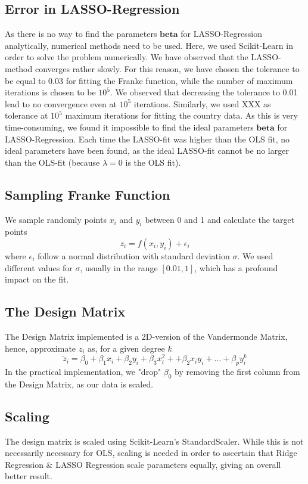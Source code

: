 \documentclass[11pt,a4paper,titlepage]{article}
\begin{document}
\subsection{Error in LASSO-Regression}
As there is no way to find the parameters $\bm{beta}$ for LASSO-Regression analytically, numerical methods need to be used. Here, we used Scikit-Learn in order to solve the problem numerically. We have observed that the LASSO-method converges rather slowly. For this reason, we have chosen the tolerance to be equal to 0.03 for fitting the Franke function, while the number of maximum iterations is chosen to be $10^5$. We observed that decreasing the tolerance to 0.01 lead to no convergence even at $10^5$ iterations. Similarly, we used XXX as tolerance at $10^5$ maximum iterations for fitting the country data. As this is very time-consuming, we found it impossible to find the ideal parameters $\bm{beta}$ for LASSO-Regression. Each time the LASSO-fit was higher than the OLS fit, no ideal parameters have been found, as the ideal LASSO-fit cannot be no larger than the OLS-fit (because $\lambda=0$ is the OLS fit).
\subsection{Sampling Franke Function}
We sample randomly points $x_i$ and $y_i$ between 0 and 1 and calculate the target points
\begin{equation*}
z_i=f(x_i,y_i)+\epsilon_i
\end{equation*}
where $\epsilon_i$ follow a normal distribution with standard deviation $\sigma$. We used different values for $\sigma$, usually in the range $[0.01,1]$, which has a profound impact on the fit. 
\subsection{The Design Matrix}
The Design Matrix implemented is a 2D-version of the Vandermonde Matrix, hence, approximate $z_i$ as, for a given degree $k$
\begin{equation*}
\tilde z_i=\beta_0+\beta_1x_i+\beta_2y_i+\beta_3x_i^2++\beta_2x_iy_i+...+\beta_py_i^k
\end{equation*}
In the practical implementation, we "drop" $\beta_0$ by removing the first column from the Design Matrix, as our data is scaled.
\subsection{Scaling}
The design matrix is scaled using Scikit-Learn's StandardScaler. While this is not necessarily necessary for OLS, scaling is needed in order to ascertain that Ridge Regression \& LASSO Regression scale parameters equally, giving an overall better result. 
\end{document}
